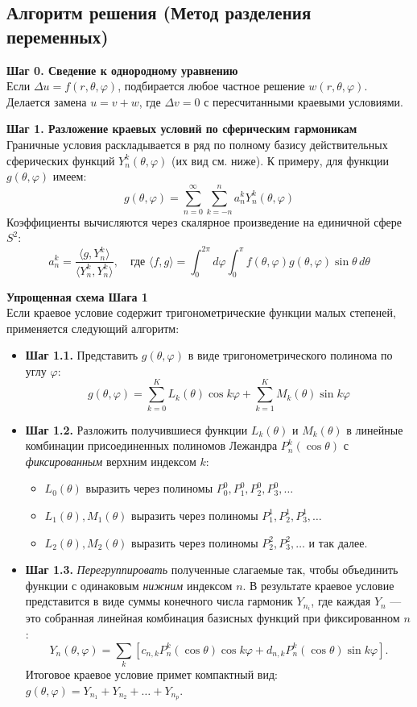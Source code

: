 \documentclass[a4paper,10pt]{article}
\begin{document}
\subsection*{Алгоритм решения (Метод разделения переменных)}

\textbf{Шаг 0. Сведение к однородному уравнению} \\
Если $\Delta u = f(r, \theta, \varphi)$, подбирается любое частное решение $w(r, \theta, \varphi)$. Делается замена $u = v + w$, где $\Delta v = 0$ с пересчитанными краевыми условиями.

\textbf{Шаг 1. Разложение краевых условий по сферическим гармоникам} \\
Граничные условия раскладывается в ряд по полному базису действительных сферических функций $Y_n^k(\theta, \varphi)$ (их вид см. ниже). К примеру, для функции $g(\theta, \varphi)$ имеем:
\[ g(\theta, \varphi) = \sum_{n=0}^\infty \sum_{k=-n}^n a_n^k Y_n^k(\theta, \varphi) \]
Коэффициенты вычисляются через скалярное произведение на единичной сфере $S^2$:
\[ a_n^k = \frac{\langle g, Y_n^k \rangle}{\langle Y_n^k, Y_n^k \rangle}, \quad \text{где } \langle f, g \rangle = \int_0^{2\pi} d\varphi \int_0^\pi f(\theta, \varphi) g(\theta, \varphi) \sin\theta \, d\theta \]

\textbf{Упрощенная схема Шага 1} \\
Если краевое условие содержит тригонометрические функции малых степеней, применяется следующий алгоритм:
\begin{itemize}
    \item \textbf{Шаг 1.1.} Представить $g(\theta, \varphi)$ в виде тригонометрического полинома по углу $\varphi$:
    \[ g(\theta, \varphi) = \sum_{k=0}^K L_k(\theta)\cos k\varphi + \sum_{k=1}^K M_k(\theta)\sin k\varphi \]
    \item \textbf{Шаг 1.2.} Разложить получившиеся функции $L_k(\theta)$ и $M_k(\theta)$ в линейные комбинации присоединенных полиномов Лежандра $P_n^k(\cos\theta)$ с \textit{фиксированным} верхним индексом $k$:
    \begin{itemize}
        \item $L_0(\theta)$ выразить через полиномы $P_0^0, P_1^0, P_2^0, P_3^0, \dots$
        \item $L_1(\theta), M_1(\theta)$ выразить через полиномы $P_1^1, P_2^1, P_3^1, \dots$
        \item $L_2(\theta), M_2(\theta)$ выразить через полиномы $P_2^2, P_3^2, \dots$ и так далее.
    \end{itemize}
    \item \textbf{Шаг 1.3.} \textit{Перегруппировать} полученные слагаемые так, чтобы объединить функции с одинаковым \textit{нижним} индексом $n$. В результате краевое условие представится в виде суммы конечного числа гармоник $Y_{n_i}$, где каждая $Y_n$ — это собранная линейная комбинация базисных функций при фиксированном $n$:
    \[ Y_n(\theta, \varphi) = \sum_{k} \left[ c_{n,k} P_n^k(\cos\theta)\cos k\varphi + d_{n,k} P_n^k(\cos\theta)\sin k\varphi \right]. \]
    Итоговое краевое условие примет компактный вид: $g(\theta, \varphi) = Y_{n_1} + Y_{n_2} + \dots + Y_{n_p}$.
\end{itemize}
\end{document}
